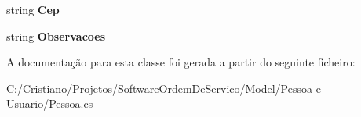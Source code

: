 \begin{DoxyCompactItemize}
\item 
\hypertarget{class_model_1_1_pessoa__e___usuario_1_1_pessoa_a52bd778675e844d78867afa43018f7ad}{}string {\bfseries Cep}\label{class_model_1_1_pessoa__e___usuario_1_1_pessoa_a52bd778675e844d78867afa43018f7ad}

\item 
\hypertarget{class_model_1_1_pessoa__e___usuario_1_1_pessoa_af6c352f8039298ee93e7efeb4427f945}{}string {\bfseries Observacoes}\label{class_model_1_1_pessoa__e___usuario_1_1_pessoa_af6c352f8039298ee93e7efeb4427f945}

\end{DoxyCompactItemize}


A documentação para esta classe foi gerada a partir do seguinte ficheiro\+:\begin{DoxyCompactItemize}
\item 
C\+:/\+Cristiano/\+Projetos/\+Software\+Ordem\+De\+Servico/\+Model/\+Pessoa e Usuario/Pessoa.\+cs\end{DoxyCompactItemize}
